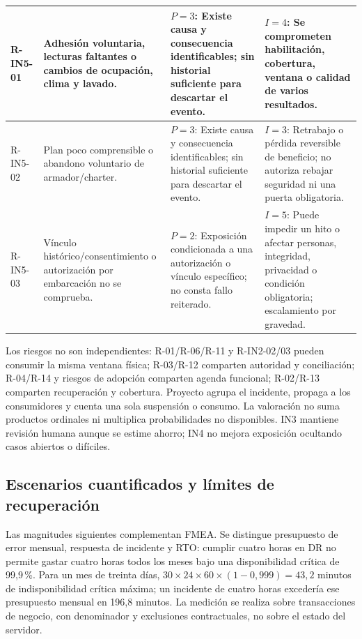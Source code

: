 \begin{longtable}{L{.10\textwidth}L{.27\textwidth}L{.27\textwidth}L{.27\textwidth}}
R-IN5-01 & Adhesión voluntaria, lecturas faltantes o cambios de ocupación, clima y lavado. & $P=3$: Existe causa y consecuencia identificables; sin historial suficiente para descartar el evento. & $I=4$: Se comprometen habilitación, cobertura, ventana o calidad de varios resultados.\\\hline
R-IN5-02 & Plan poco comprensible o abandono voluntario de armador/charter. & $P=3$: Existe causa y consecuencia identificables; sin historial suficiente para descartar el evento. & $I=3$: Retrabajo o pérdida reversible de beneficio; no autoriza rebajar seguridad ni una puerta obligatoria.\\\hline
R-IN5-03 & Vínculo histórico/consentimiento o autorización por embarcación no se comprueba. & $P=2$: Exposición condicionada a una autorización o vínculo específico; no consta fallo reiterado. & $I=5$: Puede impedir un hito o afectar personas, integridad, privacidad o condición obligatoria; escalamiento por gravedad.\\\hline
\end{longtable}\endgroup
{}
Los riesgos no son independientes: R-01/R-06/R-11 y R-IN2-02/03 pueden consumir la misma ventana física; R-03/R-12 comparten autoridad y conciliación; R-04/R-14 y riesgos de adopción comparten agenda funcional; R-02/R-13 comparten recuperación y cobertura. Proyecto agrupa el incidente, propaga a los consumidores y cuenta una sola suspensión o consumo. La valoración no suma productos ordinales ni multiplica probabilidades no disponibles. IN3 mantiene revisión humana aunque se estime ahorro; IN4 no mejora exposición ocultando casos abiertos o difíciles.

\subsection{Escenarios cuantificados y límites de recuperación}
Las magnitudes siguientes complementan FMEA. Se distingue presupuesto de error mensual, respuesta de incidente y RTO: cumplir cuatro horas en DR no permite gastar cuatro horas todos los meses bajo una disponibilidad crítica de 99,9\,\%. Para un mes de treinta días, $30\times24\times60\times(1-0{,}999)=43{,}2$ minutos de indisponibilidad crítica máxima; un incidente de cuatro horas excedería ese presupuesto mensual en 196,8 minutos. La medición se realiza sobre transacciones de negocio, con denominador y exclusiones contractuales, no sobre el estado del servidor. \parencite[arts.~20 y 78; pp.~14--15, 40]{sd8-ba}

